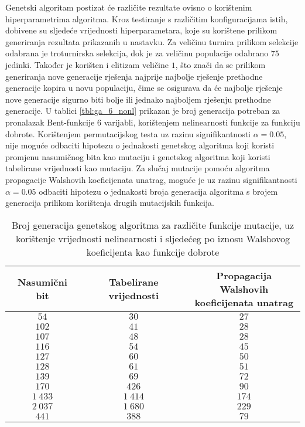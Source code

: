 Genetski algoritam postizat će različite rezultate ovisno o korištenim hiperparametrima algoritma.
Kroz testiranje s različitim konfiguracijama istih, dobivene su sljedeće vrijednosti hiperparametara, koje su korištene prilikom generiranja rezultata prikazanih u nastavku.
Za veličinu turnira prilikom selekcije odabrana je troturnirska selekcija, dok je za veličinu populacije odabrano $75$ jedinki.
Također je korišten i elitizam veličine $1$, što znači da se prilikom generiranja nove generacije rješenja najprije najbolje rješenje prethodne generacije kopira u novu populaciju, čime se osigurava da će najbolje rješenje nove generacije sigurno biti bolje ili jednako najboljem rješenju prethodne generacije.
U tablici \ref{tbl:ga_6_nonl} prikazan je broj generacija potreban za pronalazak Bent-funkcije $6$ varijabli, korištenjem nelinearnosti funkcije za funkciju dobrote.
Korištenjem permutacijskog testa uz razinu signifikantnosti $\alpha = 0.05$, nije moguće odbaciti hipotezu o jednakosti genetskog algoritma koji koristi promjenu nasumičnog bita kao mutaciju i genetskog algoritma koji koristi tabelirane vrijednosti kao mutaciju.
Za slučaj mutacije pomoću algoritma propagacije Walshovih koeficijenata unatrag, moguće je uz razinu signifikantnosti $\alpha = 0.05$ odbaciti hipotezu o jednakosti broja generacija algoritma s brojem generacija prilikom korištenja drugih mutacijskih funkcija.

\begin{table}[]
    \centering
    \captionsetup{justification=centering}
    \caption{Broj generacija genetskog algoritma za različite funkcije mutacije, uz korištenje vrijednosti nelinearnosti i sljedećeg po iznosu Walshovog koeficijenta kao funkcije dobrote}
    \begin{tabular}{ccc} \hline
        Nasumični bit & Tabelirane vrijednosti & \makecell{Propagacija Walshovih \\ koeficijenata unatrag} \\ \hline
            $54$ &     $30$ &  $27$ \\
           $102$ &     $41$ &  $28$ \\
           $107$ &     $48$ &  $28$ \\
           $116$ &     $54$ &  $45$ \\
           $127$ &     $60$ &  $50$ \\
           $128$ &     $61$ &  $51$ \\
           $139$ &     $69$ &  $72$ \\
           $170$ &    $426$ &  $90$ \\
        $1\:433$ & $1\:414$ & $174$ \\
        $2\:037$ & $1\:680$ & $229$ \\ \hline
           $441$ &    $388$ &  $79$
    \end{tabular}
    \label{tbl:ga_6_nonlV2}
\end{table}

